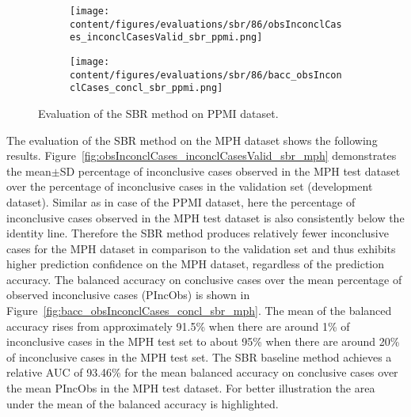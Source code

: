 \begin{figure}[ht]
  \begin{subfigure}{0.9\textwidth}
    \centering
    \texttt{[image: content/figures/evaluations/sbr/86/obsInconclCases\_inconclCasesValid\_sbr\_ppmi.png]}
    \label{fig:obsInconclCases_inconclCasesValid_sbr_ppmi}
  \end{subfigure}
  \hfill
  \begin{subfigure}{0.9\textwidth}
    \centering
    \texttt{[image: content/figures/evaluations/sbr/86/bacc\_obsInconclCases\_concl\_sbr\_ppmi.png]}
    \label{fig:bacc_obsInconclCases_concl_sbr_ppmi}
  \end{subfigure}
  \caption{Evaluation of the SBR method on PPMI dataset.}
  \label{fig:perf_results_sbr_ppmi}
\end{figure}




The evaluation of the SBR method on the MPH dataset shows the following results.
Figure~\ref{fig:obsInconclCases_inconclCasesValid_sbr_mph} demonstrates 
the mean$\pm$SD percentage of inconclusive cases observed in the MPH test dataset 
over the percentage of inconclusive cases in the validation set (development dataset).
Similar as in case of the PPMI dataset, here the percentage of inconclusive cases observed in the MPH test dataset
is also consistently below the identity line.
Therefore the SBR method produces relatively fewer inconclusive cases for the MPH dataset  
in comparison to the validation set and thus exhibits higher prediction confidence on the MPH dataset, 
regardless of the prediction accuracy.
The balanced accuracy on conclusive cases over the mean percentage of observed inconclusive cases (PIncObs) is shown 
in Figure~\ref{fig:bacc_obsInconclCases_concl_sbr_mph}.
The mean of the balanced accuracy rises from approximately 91.5\% 
when there are around 1\% of inconclusive cases in the MPH test set to about 95\% 
when there are around 20\% of inconclusive cases in the MPH test set.
The SBR baseline method achieves a relative AUC of 93.46\% for the mean balanced accuracy on conclusive cases 
over the mean PIncObs in the MPH test dataset.
For better illustration the area under the mean of the balanced accuracy is highlighted.


